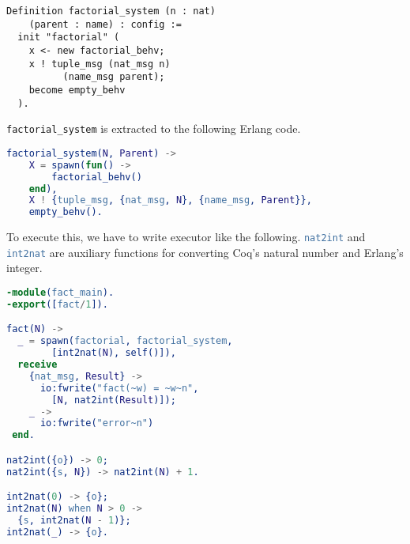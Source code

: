 \begin{lstlisting}
Definition factorial_system (n : nat)
    (parent : name) : config :=
  init "factorial" (
    x <- new factorial_behv;
    x ! tuple_msg (nat_msg n)
          (name_msg parent);
    become empty_behv
  ).
\end{lstlisting}

\lstinline|factorial_system| is extracted to the following Erlang code.

\begin{lstlisting}[language=erlang]
factorial_system(N, Parent) ->
    X = spawn(fun() ->
        factorial_behv()
    end),
    X ! {tuple_msg, {nat_msg, N}, {name_msg, Parent}},
    empty_behv().
\end{lstlisting}

To execute this, we have to write executor like the following.
\lstinline[language=erlang]|nat2int| and \lstinline[language=erlang]|int2nat| are auxiliary functions for converting Coq's natural number and Erlang's integer.

\begin{lstlisting}[language=erlang]
-module(fact_main).
-export([fact/1]).

fact(N) ->
  _ = spawn(factorial, factorial_system,
        [int2nat(N), self()]),
  receive
    {nat_msg, Result} ->
      io:fwrite("fact(~w) = ~w~n",
        [N, nat2int(Result)]);
    _ ->
      io:fwrite("error~n")
 end.

nat2int({o}) -> 0;
nat2int({s, N}) -> nat2int(N) + 1.

int2nat(0) -> {o};
int2nat(N) when N > 0 ->
  {s, int2nat(N - 1)};
int2nat(_) -> {o}.
\end{lstlisting}
